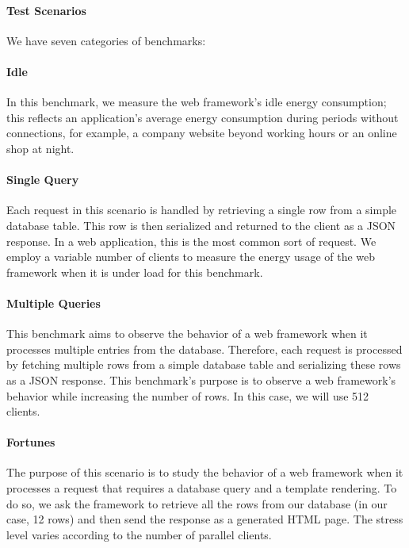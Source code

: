 \paragraph{Test Scenarios}
We have seven categories of benchmarks:
\paragraph{Idle}
In this benchmark, we measure the web framework's idle energy consumption; this reflects an application's average energy consumption during periods without connections, for example, a company website beyond working hours or an online shop at night.

\paragraph{Single Query}
Each request in this scenario is handled by retrieving a single row from a simple database table.
This row is then serialized and returned to the client as a JSON response.
In a web application, this is the most common sort of request.
We employ a variable number of clients to measure the energy usage of the web framework when it is under load for this benchmark.



\paragraph{Multiple Queries}
This benchmark aims to observe the behavior of a web framework when it processes multiple entries from the database.
Therefore, each request is processed by fetching multiple rows from a simple database table and serializing these rows as a JSON response.
This benchmark's purpose is to observe a web framework's behavior while increasing the number of rows.
In this case, we will use 512 clients.

\paragraph{Fortunes}
The purpose of this scenario is to study the behavior of a web framework when it processes a request that requires a database query and a template rendering.
To do so, we ask the framework to retrieve all the rows from our database (in our case, 12 rows) and then send the response as a generated HTML page.
The stress level varies according to the number of parallel clients.

